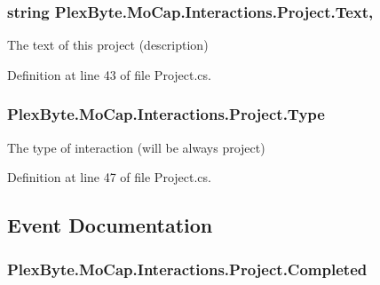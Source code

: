 \subsubsection[{\texorpdfstring{Text}{Text}}]{\setlength{\rightskip}{0pt plus 5cm}string Plex\+Byte.\+Mo\+Cap.\+Interactions.\+Project.\+Text\hspace{0.3cm}{\ttfamily [get]}, {\ttfamily [set]}}\hypertarget{class_plex_byte_1_1_mo_cap_1_1_interactions_1_1_project_aaa6c4ef85c6ebc943137fdc24705715c}{}\label{class_plex_byte_1_1_mo_cap_1_1_interactions_1_1_project_aaa6c4ef85c6ebc943137fdc24705715c}


The text of this project (description) 



Definition at line 43 of file Project.\+cs.

\subsubsection[{\texorpdfstring{Type}{Type}}]{ Plex\+Byte.\+Mo\+Cap.\+Interactions.\+Project.\+Type\hspace{0.3cm}{\ttfamily [get]}}\hypertarget{class_plex_byte_1_1_mo_cap_1_1_interactions_1_1_project_aea479ae8fe5363b41c132933c6fb6e4a}{}\label{class_plex_byte_1_1_mo_cap_1_1_interactions_1_1_project_aea479ae8fe5363b41c132933c6fb6e4a}


The type of interaction (will be always project) 



Definition at line 47 of file Project.\+cs.



\subsection{Event Documentation}
\subsubsection[{\texorpdfstring{Completed}{Completed}}]{ Plex\+Byte.\+Mo\+Cap.\+Interactions.\+Project.\+Completed}\hypertarget{class_plex_byte_1_1_mo_cap_1_1_interactions_1_1_project_a4ee1861f64f1fdc8092854c2d9c26ea0}{}\label{class_plex_byte_1_1_mo_cap_1_1_interactions_1_1_project_a4ee1861f64f1fdc8092854c2d9c26ea0}


